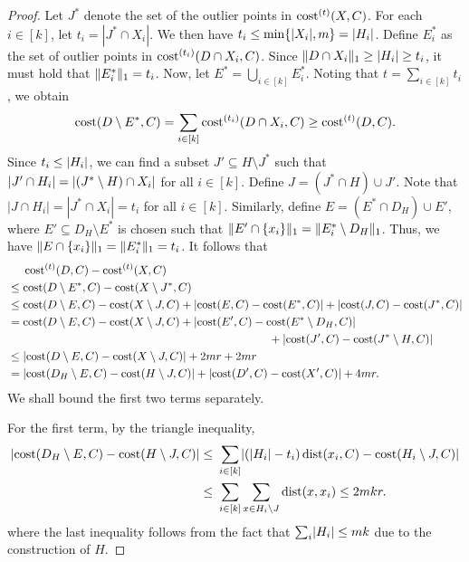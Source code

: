 \documentclass[11pt,letterpaper]{article}
\theoremstyle{definition}
\DeclareMathOperator{\dist}{dist}
\DeclarePairedDelimiter{\abs}{\lvert}{\rvert}
\DeclarePairedDelimiter{\norm}{\lVert}{\rVert}
\begin{document}
\begin{proof}
Let $J^\ast$ denote the set of the outlier points in $\cost[t](X, C)$.
%
For each $i\in [k]$, let $t_i = |J^\ast \cap X_i|$. We then have $t_i \leq \min\{\abs{X_i}, m\} = \abs{H_i}$. Define $E^\ast_i$ as the set of outlier points in $\cost[t_i](D\cap X_i, C)$. Since $\norm{D\cap X_i}_1\geq \abs{H_i}\geq t_i$, it must hold that $\norm{E^\ast_i}_1 = t_i$. Now, let $E^\ast = \bigcup_{i\in [k]} E_i^\ast$. Noting that $t = \sum_{i\in [k]} t_i$, we obtain 
\[
\cost(D\setminus E^\ast, C) = \sum_{i\in [k]} \cost[t_i](D\cap X_i, C) \geq \cost[t](D, C).
\]
Since $t_i \leq \abs{H_i}$, we can find a subset $J'\subseteq H\setminus J^\ast$ such that $\abs{J'\cap H_i} = \abs{(J^\ast\setminus H)\cap X_i}$ for all $i\in [k]$. Define $J = (J^\ast\cap H)\cup J'$. 
Note that $|J\cap H_i| = |J^\ast\cap X_i| = t_i$ for all $i\in [k]$.
%
Similarly, define $E = (E^\ast \cap D_H)\cup E'$, where $E'\subseteq D_H\setminus E^\ast$ is chosen such that $\norm{E'\cap \{x_i\}}_1 = \norm{E_i^\ast\setminus D_H}_1$. Thus, we have $\norm{E\cap \{x_i\}}_1 = \norm{E^\ast_i}_1 = t_i$.
%
It follows that
	\begin{align*}
		&\quad\ \cost[t](D,C) - \cost[t](X,C) \\
		&\leq \cost(D\setminus E^\ast,C) - \cost(X\setminus J^\ast,C) \\
		&\leq \cost(D\setminus E,C) - \cost(X\setminus J,C)  + \abs{ \cost(E,C) - \cost(E^\ast,C) } + \abs{ \cost(J,C) - \cost(J^\ast,C) }\\
		&=  \cost(D\setminus E,C) - \cost(X\setminus J,C)  + \abs{ \cost(E',C) - \cost(E^\ast\setminus D_H,C) } \\
		&\hspace*{8cm} + \abs{ \cost(J',C) - \cost(J^\ast\setminus H,C) } \\
		&\leq \abs{ \cost(D\setminus E,C) - \cost(X\setminus J,C) } + 2mr + 2mr\\
		&= \abs{\cost(D_H\setminus E, C) - \cost(H\setminus J,C)} + \abs{\cost(D', C) - \cost(X',C)} + 4mr.
	\end{align*}
	We shall bound the first two terms separately.
	
	For the first term, by the triangle inequality,
	\begin{align*}
	\abs{\cost(D_H\setminus E, C) - \cost(H\setminus J, C)}
	\leq & \ \sum_{i\in [k]} \abs{(|H_i|-t_i)\dist(x_i, C) - \cost(H_i\setminus J, C)} \\
    \leq & \ \sum_{i\in [k]} \sum_{x\in H_i\setminus J} \dist(x,x_i)
	\leq 2mkr.
	\end{align*}
	where the last inequality follows from the fact that $\sum_i \abs{H_i} \leq mk$ due to the construction of $H$.
	

\end{proof}
\end{document}
